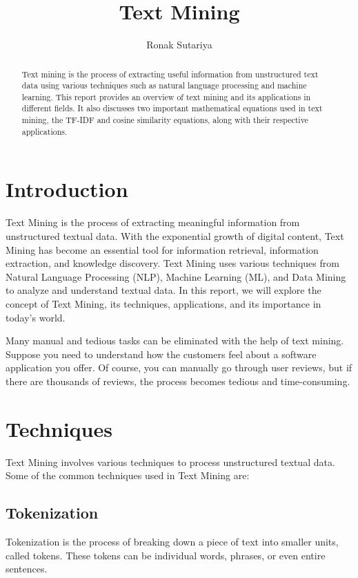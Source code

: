 \documentclass{article}
\title{Text Mining}
\author{Ronak Sutariya}
\begin{document}
\maketitle

\begin{abstract}
Text mining is the process of extracting useful information from unstructured text data using various techniques such as natural language processing and machine learning. This report provides an overview of text mining and its applications in different fields. It also discusses two important mathematical equations used in text mining, the TF-IDF and cosine similarity equations, along with their respective applications.
\end{abstract}

\section{Introduction}
Text Mining is the process of extracting meaningful information from unstructured textual data. With the exponential growth of digital content, Text Mining has become an essential tool for information retrieval, information extraction, and knowledge discovery. Text Mining uses various techniques from Natural Language Processing (NLP), Machine Learning (ML), and Data Mining to analyze and understand textual data. In this report, we will explore the concept of Text Mining, its techniques, applications, and its importance in today's world.

Many manual and tedious tasks can be eliminated with the help of text mining. Suppose you need to understand how the customers feel about a software application you offer. Of course, you can manually go through user reviews, but if there are thousands of reviews, the process becomes tedious and time-consuming\cite{RefWork:1}.

\section{Techniques}

Text Mining involves various techniques to process unstructured textual data\cite{RefWork:2}. Some of the common techniques used in Text Mining are:

\subsection{Tokenization}

Tokenization is the process of breaking down a piece of text into smaller units, called tokens. These tokens can be individual words, phrases, or even entire sentences.
\end{document}
